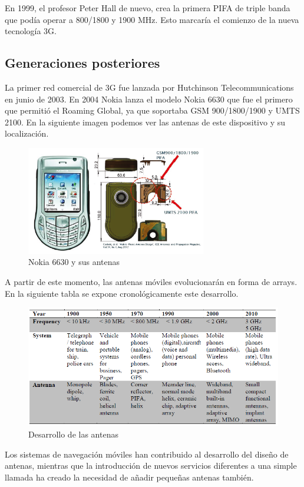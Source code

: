 \documentclass[a4paper,11pt,titlepage]{article}
\begin{document}
En 1999, el profesor Peter Hall de nuevo, crea la primera PIFA de triple banda que podía operar a 800/1800 y 1900 MHz. Esto marcaría el comienzo de la nueva tecnología 3G.
\newpage
\subsection{Generaciones posteriores}
La primer red comercial de 3G fue lanzada por Hutchinson Telecommunications en junio de 2003. En 2004 Nokia lanza el modelo Nokia 6630 que fue el primero que permitió el Roaming Global, ya que soportaba GSM 900/1800/1900 y UMTS 2100. En la siguiente imagen podemos ver las antenas de este dispositivo y su localización.
\begin{figure}[H]
\centering
\includegraphics[width=0.7\textwidth]{nokia6630}
\caption{Nokia 6630 y sus antenas}
\end{figure}
A partir de este momento, las antenas móviles evolucionarán en forma de arrays. En la siguiente tabla se expone cronológicamente este desarrollo.
\begin{figure}[H]
\centering
\includegraphics[width=1.2\textwidth]{crono}
\caption{Desarrollo de las antenas}
\end{figure}
Los sistemas de navegación móviles han contribuido al desarrollo del diseño de antenas, mientras que la introducción de nuevos servicios diferentes a una simple llamada ha creado la necesidad de añadir pequeñas antenas también.
\end{document}
